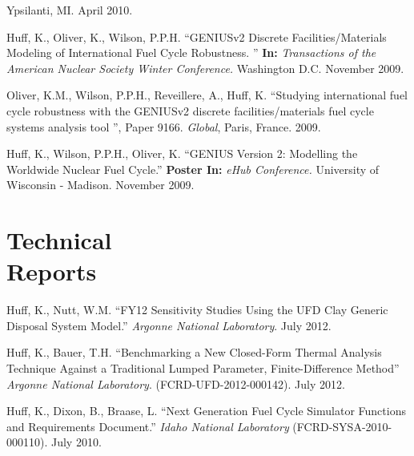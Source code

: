 \documentclass[margin,line]{resume}
\begin{document}
\begin{resume}
\begin{bibenum}
        Ypsilanti, MI. April 2010.
      \item Huff, K., Oliver, K., Wilson, P.P.H. ``GENIUSv2 Discrete Facilities/Materials Modeling of International 
        Fuel Cycle Robustness. ''
        \textbf{In: } \emph{Transactions of the American Nuclear Society Winter Conference.} 
        Washington D.C. November 2009. 
      \item Oliver, K.M., Wilson, P.P.H., Reveillere, A., Huff, K. ``Studying 
          international fuel cycle robustness with the GENIUSv2 discrete 
          facilities/materials fuel cycle systems analysis tool	'', Paper 9166. 
          \textsl{Global}, Paris, France. 2009.
      \item Huff, K., Wilson, P.P.H., Oliver, K. ``GENIUS Version 2: Modelling the Worldwide Nuclear Fuel Cycle.'' 
        \textbf{Poster In: } \emph{eHub Conference.} University of Wisconsin - 
        Madison. November 2009.
    \end{bibenum}

    \section{\mysidestyle Technical\\Reports}
    \begin{bibenum}
      \item Huff, K., Nutt, W.M. ``FY12 Sensitivity Studies Using the UFD Clay Generic Disposal System Model.'' 
        \emph{Argonne National Laboratory}. July 2012.
      \item Huff, K., Bauer, T.H. ``Benchmarking a New Closed-Form Thermal Analysis Technique Against a Traditional
        Lumped Parameter, Finite-Difference Method'' \emph{Argonne National Laboratory}. (FCRD-UFD-2012-000142). July 2012.
      \item Huff, K., Dixon, B., Braase, L. ``Next Generation Fuel Cycle Simulator Functions and Requirements Document.'' 
        \emph{Idaho National Laboratory} (FCRD-SYSA-2010-000110). July 2010. 
    \end{bibenum}

\end{resume}
\end{document}
